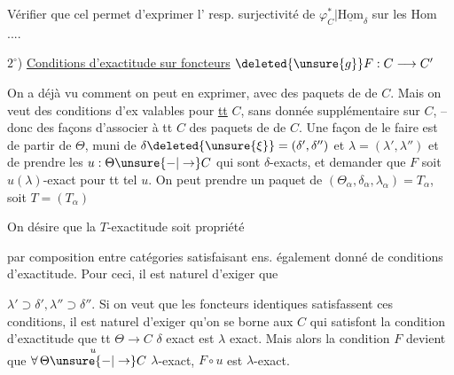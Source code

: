 Vérifier que cel permet  d'exprimer l' resp. surjectivité de $\varphi^*_C\vert\underline{\mathrm{Hom}}_\delta$ sur les Hom ....

$2^\circ$) \uline{Conditions d'exactitude sur foncteurs} $\deleted{\unsure{g}}F:C\longrightarrow C'$

On a déjà vu comment on peut en exprimer, avec des paquets de  de $C$. Mais on veut des conditions  d'ex valables pour \uline{tt} $C$, sans donnée supplémentaire sur $C$, -- donc des façons d'associer à tt $C$ des paquets de  de $C$. Une façon de le faire est de partir de $\Theta$, muni de $\delta\deleted{\unsure{\xi}}=(\delta',\delta'')$ et $\lambda=(\lambda',\lambda'')$  et de prendre les $u:\Theta\unsure{-|\to}C$ qui sont $\delta$-exacts, et demander que $F$ soit $u(\lambda)$-exact pour tt tel $u$. On peut prendre un paquet de  $(\Theta_\alpha,\delta_\alpha,\lambda_\alpha)=T_\alpha$, soit $T=(T_\alpha)$

On désire que  la $T$-exactitude soit propriété


par composition  entre catégories satisfaisant  ens. également donné de conditions d'exactitude. Pour ceci, il est  naturel d'exiger que


 $\lambda'\supset\delta',\lambda''\supset\delta''$. Si on veut que les foncteurs identiques satisfassent ces conditions, il est naturel d'exiger qu'on se borne aux $C$ qui satisfont la condition d'exactitude que tt $\Theta\to C$ $\delta$ exact est $\lambda$ exact. Mais alors la condition  $F$ devient que $\forall\,\Theta\overset{u}{\unsure{-|\to}} C$ $\lambda$-exact, $F\circ u$ est $\lambda$-exact.

